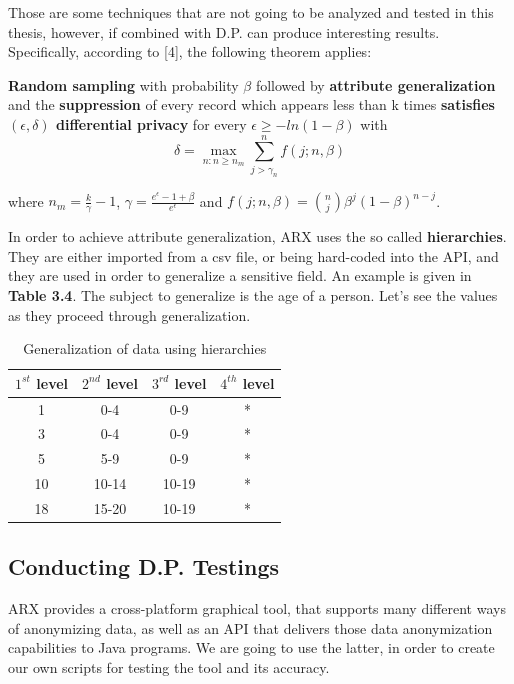 Those are some techniques that are not going to be analyzed and tested in this thesis, however, if combined with D.P. can produce interesting results. Specifically, according to [4], the following theorem applies:

\textbf{Random sampling} with probability $\beta$ followed by \textbf{attribute generalization} and the \textbf{suppression} of
every record which appears less than k times \textbf{satisfies $(\epsilon, \delta)$ differential privacy} for every $\epsilon \geq -ln(1-\beta)$ with 
$$\delta = \max_{n:n \geq n_m} \sum_{j>\gamma_n}^{n}f(j;n,\beta)$$

where $n_m = \frac{k}{\gamma} - 1$, $\gamma = \frac{e^\epsilon-1+\beta}{e^\epsilon}$ and $f(j;n,\beta) = {n \choose  j} \beta^j(1-\beta)^{n-j}$.

In order to achieve attribute generalization, ARX uses the so called \textbf{hierarchies}. They are either imported from a csv file, or being hard-coded into the API, and they are used in order to generalize a sensitive field. An example is given in \textbf{Table 3.4}. The subject to generalize is the age of a person. Let's see the values as they proceed through generalization.

\begin{table}[!htb]
    \centering

    \caption{Generalization of data using hierarchies}
    \label{numbers}

    \begin{tabular}{| c | c | c | c |}
      \hline 
      $1^{st}$ level & $2^{nd}$ level & $3^{rd}$ level & $4^{th}$ level\\
      \hline
      1 & 0-4 & 0-9 & *\\
      \hline
      3 & 0-4 & 0-9 & *\\
      \hline
      5 & 5-9 & 0-9 & * \\
      \hline
      10 & 10-14 & 10-19 & *\\
      \hline
      18 & 15-20 & 10-19 & *\\
      \hline
    
    \end{tabular}
\end{table}

\subsection{Conducting D.P. Testings}

ARX provides a cross-platform graphical tool, that supports many different ways of anonymizing data, as well as an API that delivers those data anonymization capabilities to Java programs. We are going to use the latter, in order to create our own scripts for testing the tool and its accuracy.

